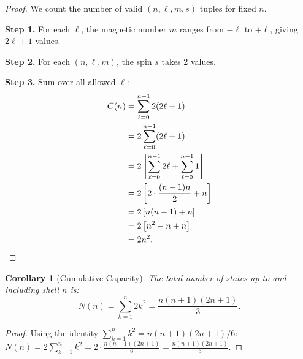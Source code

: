 \documentclass[10pt,twocolumn]{article}
\newtheorem{corollary}[theorem]{Corollary}
\theoremstyle{remark}
\begin{document}
\begin{proof}
We count the number of valid $(n, \ell, m, s)$ tuples for fixed $n$.

\textbf{Step 1.} For each $\ell$, the magnetic number $m$ ranges from $-\ell$ to $+\ell$, giving $2\ell + 1$ values.

\textbf{Step 2.} For each $(n, \ell, m)$, the spin $s$ takes 2 values.

\textbf{Step 3.} Sum over all allowed $\ell$:
\begin{align}
C(n) &= \sum_{\ell=0}^{n-1} 2(2\ell + 1) \notag \\
&= 2 \sum_{\ell=0}^{n-1} (2\ell + 1) \notag \\
&= 2 \left[ \sum_{\ell=0}^{n-1} 2\ell + \sum_{\ell=0}^{n-1} 1 \right] \notag \\
&= 2 \left[ 2 \cdot \frac{(n-1)n}{2} + n \right] \notag \\
&= 2 \left[ n(n-1) + n \right] \notag \\
&= 2 \left[ n^2 - n + n \right] \notag \\
&= 2n^2. \qedhere
\end{align}
\end{proof}

\begin{corollary}[Cumulative Capacity]
\label{cor:cumcap}
The total number of states up to and including shell $n$ is:
\begin{equation}
N(n) = \sum_{k=1}^{n} 2k^2 = \frac{n(n+1)(2n+1)}{3}.
\label{eq:cumcap}
\end{equation}
\end{corollary}

\begin{proof}
Using the identity $\sum_{k=1}^n k^2 = n(n+1)(2n+1)/6$:
$N(n) = 2 \sum_{k=1}^n k^2 = 2 \cdot \frac{n(n+1)(2n+1)}{6} = \frac{n(n+1)(2n+1)}{3}$.
\end{proof}
\end{document}
